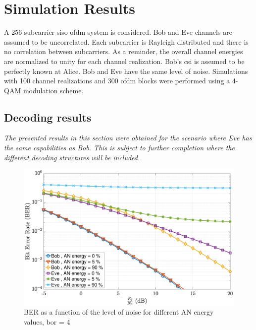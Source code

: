 \section{Simulation Results}
\label{sec:result}





A 256-subcarrier \gls{siso} \gls{ofdm} system is considered. Bob and Eve channels are assumed to be uncorrelated. Each subcarrier is Rayleigh distributed and there is no correlation between subcarriers. As a reminder, the overall channel energies are normalized to unity for each channel realization. Bob's \gls{csi} is assumed to be perfectly known at Alice. Bob and Eve have the same level of noise. Simulations with 100 channel realizations and 300 \gls{ofdm} blocks were performed using a 4-QAM modulation scheme. 


\subsection{Decoding results}
\textit{The presented results in this section were obtained for the scenario where Eve has the same capabilities as Bob. This is subject to further completion where the different decoding structures will be included.}
\begin{figure}[htb!]
    \centering
    \centerline{\includegraphics[width = .65\textwidth]{graphs/ber_ebno_alpha_bor_globcom.eps}}
    \caption{BER as a function of the level of noise for different AN energy values, \gls{bor} = 4}
    \label{fig:ber_ebno}
\end{figure}

